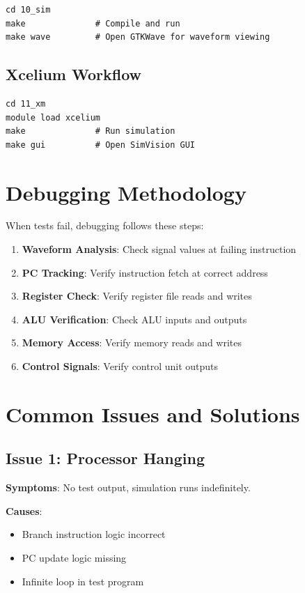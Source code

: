 \begin{verbatim}
cd 10_sim
make              # Compile and run
make wave         # Open GTKWave for waveform viewing
\end{verbatim}

\subsection{Xcelium Workflow}

\begin{verbatim}
cd 11_xm
module load xcelium
make              # Run simulation
make gui          # Open SimVision GUI
\end{verbatim}

\section{Debugging Methodology}

When tests fail, debugging follows these steps:

\begin{enumerate}
    \item \textbf{Waveform Analysis}: Check signal values at failing instruction
    \item \textbf{PC Tracking}: Verify instruction fetch at correct address
    \item \textbf{Register Check}: Verify register file reads and writes
    \item \textbf{ALU Verification}: Check ALU inputs and outputs
    \item \textbf{Memory Access}: Verify memory reads and writes
    \item \textbf{Control Signals}: Verify control unit outputs
\end{enumerate}

\section{Common Issues and Solutions}

\subsection{Issue 1: Processor Hanging}

\textbf{Symptoms}: No test output, simulation runs indefinitely.

\textbf{Causes}:
\begin{itemize}
    \item Branch instruction logic incorrect
    \item PC update logic missing
    \item Infinite loop in test program
\end{itemize}

